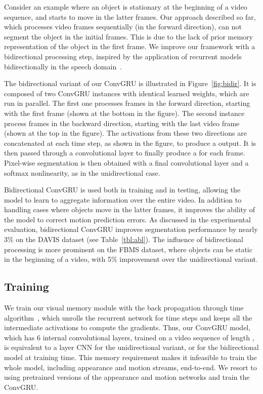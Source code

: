 \documentclass[10pt,twocolumn,letterpaper]{article}
\begin{document}
Consider an example where an object is stationary at the beginning of a video
sequence, and starts to move in the latter frames. Our approach described so
far, which processes video frames sequentially (in the forward direction), can
not segment the object in the initial frames.  This is due to the lack of prior
memory representation of the object in the first frame. We improve our
framework with a bidirectional processing step, inspired by the application of
recurrent models bidirectionally in the speech
domain~\cite{graves2005framewise,graves2013hybrid}.

The bidirectional variant of our ConvGRU is illustrated in
Figure~\ref{fig:bidir}. It is composed of two ConvGRU instances with identical
learned weights, which are run in parallel. The first one processes frames in
the forward direction, starting with the first frame (shown at the bottom in
the figure). The second instance process frames in the backward direction,
starting with the last video frame (shown at the top in the figure). The
activations from these two directions are concatenated at each time step, as
shown in the figure, to produce a  output. It is
then passed through a  convolutional layer to finally produce a  for each frame. Pixel-wise segmentation is then obtained
with a final  convolutional layer and a softmax nonlinearity, as in
the unidirectional case.

Bidirectional ConvGRU is used both in training and in testing, allowing the
model to learn to aggregate information over the entire video. In addition to
handling cases where objects move in the latter frames, it improves the ability
of the model to correct motion prediction errors. As discussed in the
experimental evaluation, bidirectional ConvGRU improves segmentation
performance by nearly 3\% on the DAVIS dataset (see Table~\ref{tbl:abl}). The
influence of bidirectional processing is more prominent on the FBMS dataset, where objects can be static in the beginning of a video,
with 5\% improvement over the unidirectional variant.

\subsection{Training}
\label{sec:train}
We train our visual memory module with the back propagation through time
algorithm~\cite{werbos1990backpropagation}, which unrolls the recurrent network
for  time steps and keeps all the intermediate activations to compute the
gradients. Thus, our ConvGRU model, which has 6 internal convolutional layers,
trained on a video sequence of length , is equivalent to a  layer CNN
for the unidirectional variant, or  for the bidirectional model at
training time. This memory requirement makes it infeasible to train the
whole model, including appearance and motion streams, end-to-end. We resort to
using pretrained versions of the appearance and motion networks and train the
ConvGRU.
\end{document}
